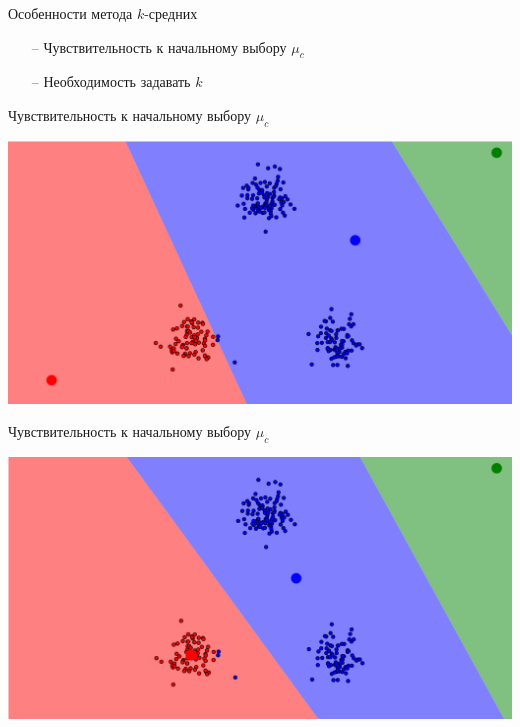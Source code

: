 \documentclass[10pt]{beamer}
\begin{document}
\begin{frame}{Особенности метода $k$-средних}
	\begin{itemize}
		\item[--] Чувствительность к начальному выбору $\mu_c$
		\item[--] Необходимость задавать $k$
	\end{itemize}
\end{frame}

\begin{frame}{Чувствительность к начальному выбору $\mu_c$}
	\begin{center}
	  \includegraphics[width= \textwidth, keepaspectratio = true]{images/localmin1}  
	\end{center}
\end{frame}

\begin{frame}{Чувствительность к начальному выбору $\mu_c$}
	\begin{center}
	  \includegraphics[width= \textwidth, keepaspectratio = true]{images/localmin2}  
	\end{center}
\end{frame}
\end{document}
